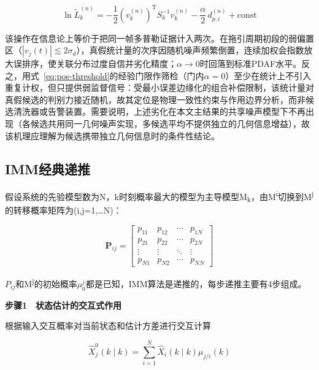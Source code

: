 \documentclass[UTF8,a4paper,zihao=-4]{ctexart}
\begin{document}
\begin{equation}
\ln\tilde{L}_k^{(n)}=-\frac{1}{2}(v_k^{(n)})^{\mathrm T}S_k^{-1}v_k^{(n)}-\frac{\alpha}{2}\,d_{p,i}^{(n)}+\mathrm{const}
\label{eq:double-count}
\end{equation}

该操作在信息论上等价于把同一帧多普勒证据计入两次。在拖引周期初段的弱偏置区（\(|v_j(t)|\lesssim2\sigma_d\)），真假统计量的次序因随机噪声频繁倒置，连续加权会指数放大误排序，使关联分布过度自信并劣化精度；\(\alpha\to0\)时回落到标准PDAF水平。反之，用式~\eqref{eq:pos-threshold}的经验门限作筛检（门内\(\alpha=0\)）至少在统计上不引入重复计权，但只提供弱监督信号：受最小误差边缘化的组合补偿限制，该统计量对真假候选的判别力接近随机，故其定位是物理一致性约束与作用边界分析，而非候选清洗器或告警装置。需要说明，上述劣化在本文主结果的共享噪声模型下不再出现（各候选共用同一几何噪声实现，多候选平均不提供独立的几何信息增益），故该机理应理解为候选携带独立几何信息时的条件性结论。



\subsection{IMM经典递推}\label{sup:imm}
假设系统的先验模型数为N，k时刻概率最大的模型为主导模型M\textsubscript{k}，由M\textsuperscript{i}切换到M\textsuperscript{j}的转移概率矩阵为(i,j=1,\ldots N)：


\begin{equation}
\mathbf{P}_{ij}=\begin{bmatrix}p_{11}&p_{12}&\cdots&p_{1N}\\p_{21}&p_{22}&\cdots&p_{2N}\\\vdots&\vdots&\ddots&\vdots\\p_{N1}&p_{N2}&\cdots&p_{NN}\end{bmatrix}
\label{eq:word-52}
\end{equation}


\(P_{ij}\)和M\textsuperscript{j}的初始概率\(\mu_0^j\)都是已知，IMM算法是递推的，每步递推主要有4步组成。

\noindent\textbf{步骤1　状态估计的交互式作用}\par

根据输入交互概率对当前状态和估计方差进行交互计算


\begin{equation}
\hat{X}_j^0(k\mid k)=\sum_{i=1}^{N}\hat{X}_i(k\mid k)\mu_{j/i}(k)
\label{eq:word-54}
\end{equation}
\end{document}
